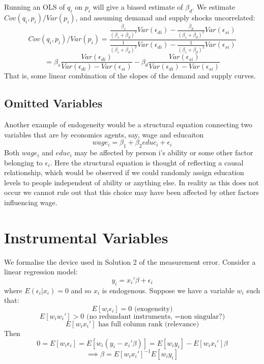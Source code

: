 \documentclass[DIV=14,titlepage=false]{scrreprt}
\begin{document}
Running an OLS of \(q_i\) on \(p_i\) will give a biased estimate of \(\beta_d\).
We estimate \(Cov(q_i,p_i)/Var(p_i)\), and assuming demanad and supply shocks uncorrelated:
\[Cov(q_i,p_i)/Var(p_i)=\frac{\frac{\beta_s}{(\beta_s+\beta_d)^2}Var(\epsilon_{di})-\frac{\beta_d}{(\beta_s+\beta_d)^2}Var(\epsilon_{si})}{\frac{1}{(\beta_s+\beta_d)^2}Var(\epsilon_{di})-\frac{1}{(\beta_s+\beta_d)^2}Var(\epsilon_{si})}\]
\[=\beta_s\frac{Var(\epsilon_{di})}{Var(\epsilon_{di})-Var(\epsilon_{si})}-\beta_d\frac{Var(\epsilon_{si})}{Var(\epsilon_{di})-Var(\epsilon_{si})}\]
That is, some linear combination of the slopes of the demand and supply curves.

\subsection{Omitted Variables}
Another example of endogeneity would be a structural equation connecting two variables that are \underline{} by economics agents, say, wage and educaiton
\[wage_i=\beta_1+\beta_2educ_i+\epsilon_i\]
Both \(wage_i\) and \(educ_i\) may be affected by person i's ability or some other factor belonging to \(\epsilon_i\). Here the structural equation is thought of reflecting a causal relationship, which would be observed if we could randomly assign education levels to people independent of ability or anything else.
In reality as this does not occur we cannot rule out that this choice may have been affected by other factors influencing wage.

\section{Instrumental Variables}
We formalise the device used in Solution 2 of the measurement error.
Consider a linear regression model:
\[y_i=x_i'\beta+\epsilon_i\]
where \(E(\epsilon_i|x_i)=0\) and so \(x_i\) is endogenous. Suppose we have a variable \(w_i\) such that:
\[E[w_i\epsilon_i]=0 \text{ (exogeneity)}\]
\[E[w_iw_i']>0 \text{ (no redundant instruments, =non singular?)}\]
\[E[w_ix_i'] \text{ has full column rank (relevance)}\]
Then\[0=E[w_i\epsilon_i]=E[w_i(y_i-x_i'\beta)]=E[w_iy_i]-E[w_ix_i']\beta\]
\[\implies \beta=E[w_ix_i']^{-1}E[w_iy_i]\]
\end{document}
